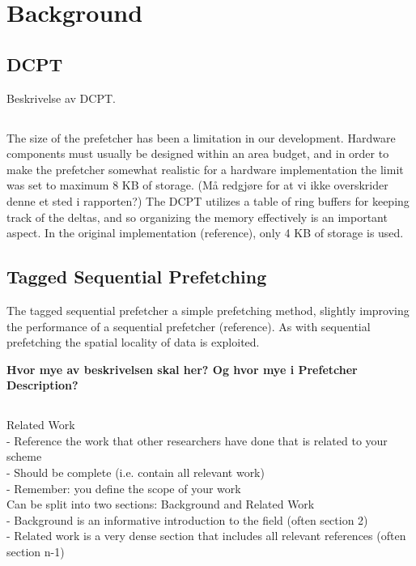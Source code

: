 \section{Background}

\subsection*{DCPT}
Beskrivelse av DCPT.

\subsection*{}
The size of the prefetcher has been a limitation in our development. Hardware components must usually be designed within an area budget, and in order to make the prefetcher somewhat realistic for a hardware implementation the limit was set to maximum 8 KB of storage. (Må redgjøre for at vi ikke overskrider denne et sted i rapporten?) The DCPT utilizes a table of ring buffers for keeping track of the deltas, and so organizing the memory effectively is an important aspect. In the original implementation (reference), only 4 KB of storage is used.

\subsection*{Tagged Sequential Prefetching}
The tagged sequential prefetcher a simple prefetching method, slightly improving the performance of a sequential prefetcher (reference). As with sequential prefetching the spatial locality of data is exploited.

\textbf{Hvor mye av beskrivelsen skal her? Og hvor mye i Prefetcher Description?}

\subsection*{}
Related Work\\
- Reference the work that other researchers have done 
that is related to your scheme\\
- Should be complete (i.e. contain all relevant work)\\
- Remember: you define the scope of your work\\
Can be split into two sections: Background and Related 
Work\\
- Background is an informative introduction to the field (often section 2)\\
- Related work is a very dense section that includes all relevant 
references (often section n-1)\\

